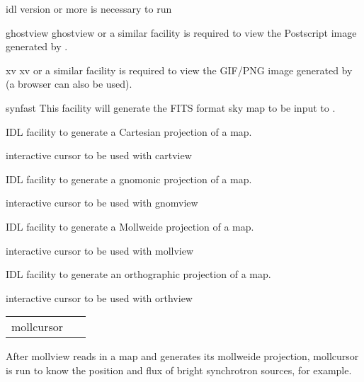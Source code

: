 \begin{related}
  \begin{sulist}{} %
  \item[idl] version \idlversion or more is necessary to run \thedocid
  \item[ghostview] ghostview or a similar facility is required to view
	  the Postscript image generated by \thedocid.
  \item[xv] xv or a similar facility is required to view the
            GIF/PNG image generated by \thedocid  (a browser can also 
            be used).
  \item[synfast] This \healpix facility will generate the FITS format 
            sky map to be input to \thedocid.
  \item[{\htmlref{cartview}{idl:cartview}}] 
	IDL facility to generate a Cartesian projection of
  	a \healpix map.
  \item[{\htmlref{cartcursor}{idl:cartcursor}}] 
	interactive cursor to be used with cartview
  \item[{\htmlref{gnomview}{idl:gnomview}}] 
	IDL facility to generate a gnomonic projection of
  	a \healpix map.
  \item[{\htmlref{gnomcursor}{idl:gnomcursor}}] 
	interactive cursor to be used with gnomview
  \item[{\htmlref{mollview}{idl:mollview}}] 
	IDL facility to generate a Mollweide projection of
  	a \healpix map.
  \item[{\htmlref{mollcursor}{idl:mollcursor}}] interactive cursor to be used with mollview
  \item[{\htmlref{orthview}{idl:orthview}}] 
	IDL facility to generate an orthographic projection of
  	a \healpix map.
  \item[{\htmlref{orthcursor}{idl:orthcursor}}] 
	interactive cursor to be used with orthview
  \end{sulist}
\end{related}

\begin{example}
{
\begin{tabular}{ll} %
mollcursor & \ 
\end{tabular}
}
{After mollview reads in a map and generates
its mollweide projection, mollcursor is run to know the
position and flux of bright synchrotron sources, for example.}
\end{example}



